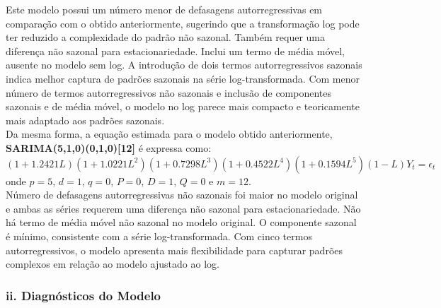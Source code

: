 \documentclass[a4paper, 12pt]{article}
\begin{document}
\begin{itemize}
    Este modelo possui um número menor de defasagens autorregressivas em comparação com o obtido anteriormente,  sugerindo que a transformação log pode ter reduzido a complexidade do padrão não sazonal. Também requer uma diferença não sazonal para estacionariedade. Inclui um termo de média móvel, ausente no modelo sem log.  A introdução de dois termos autorregressivos sazonais indica melhor captura de padrões sazonais na série log-transformada. Com menor número de termos autorregressivos não sazonais e inclusão de componentes sazonais e de média móvel, o modelo no log parece mais compacto e teoricamente mais adaptado aos padrões sazonais.\\

    Da mesma forma, a equação estimada para o modelo obtido anteriormente, \textbf{SARIMA(5,1,0)(0,1,0)[12] }é expressa como:
    \[
    (1+1.2421L)(1+1.0221L^2)(1+0.7298L^3)(1+0.4522L^4)(1+0.1594L^5)(1-L)Y_t = \epsilon_t
    \]
    onde $p=5$,  $d=1$,  $q=0$, $P=0$, $D=1$, $Q=0$ e $m=12$.\\

    Número de defasagens autorregressivas não sazonais foi maior no modelo original e ambas as séries requerem uma diferença não sazonal para estacionariedade. Não há termo de média móvel não sazonal no modelo original.  O componente sazonal é mínimo, consistente com a série log-transformada. Com cinco termos autorregressivos, o modelo apresenta mais flexibilidade para capturar padrões complexos em relação ao modelo ajustado ao log.

\end{itemize}
        
        

\subsubsection{ii. Diagnósticos do Modelo}
\end{document}
